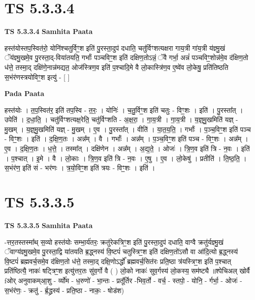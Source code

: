 \documentclass[17pt]{extarticle}
\begin{document}

\section{ TS 5.3.3.4 }

\textbf{TS 5.3.3.4 } \newline
\textbf{Samhita Paata} \newline

हस्त॑योस्तप॒स्वित॑रो॒ योनि॑श्चतुर्विꣳ॒॒श इति॑ पु॒रस्ता॒दुप॑ दधाति॒ चतु॑र्विꣳशत्यक्षरा गाय॒त्री गा॑य॒त्री य॑ज्ञ्मु॒खं ॅय॑ज्ञ्मु॒खमे॒व पु॒रस्ता॒द्-विया॑तयति॒ गर्भाः᳚ पञ्चविꣳ॒॒श इति॑ दक्षिण॒तोऽन्नं॒ ॅवै गर्भा॒ अन्नं॑ पञ्चविꣳ॒॒शोन्न॑मे॒व द॑क्षिण॒तो ध॑त्ते॒ तस्मा॒द् दक्षि॑णे॒नान्न॑मद्यत॒ ओज॑स्त्रिण॒व इति॑ प॒श्चादि॒मे वै लो॒कास्त्रि॑ण॒व ए॒ष्वे॑व लो॒केषु॒ प्रति॑तिष्ठति स॒भंर॑णस्त्रयोविꣳ॒॒श इत्यु॑ - [  ] \newline

\textbf{Pada Paata} \newline

हस्त॑योः । त॒प॒स्वित॑र॒ इति॑ तप॒स्वि - त॒रः॒ । योनिः॑ । च॒तु॒र्विꣳ॒॒श इति॑ चतुः - विꣳ॒॒शः । इति॑ । पु॒रस्ता᳚त् । उपेति॑ । द॒धा॒ति॒ । चतु॑र्विꣳशत्यक्ष॒रेति॒ चतु॑र्विꣳशति - अ॒क्ष॒रा॒ । गा॒य॒त्री । गा॒य॒त्री । य॒ज्ञ्॒मु॒खमिति॑ यज्ञ् - मु॒खम् । य॒ज्ञ्॒मु॒खमिति॑ यज्ञ् - मु॒खम् । ए॒व । पु॒रस्ता᳚त् । वीति॑ । या॒त॒य॒ति॒ । गर्भाः᳚ । प॒ञ्च॒विꣳ॒॒श इति॑ पञ्च - विꣳ॒॒शः । इति॑ । द॒क्षि॒ण॒तः । अन्न᳚म् । वै । गर्भाः᳚ । अन्न᳚म् । प॒ञ्च॒विꣳ॒॒श इति॑ पञ्च - विꣳ॒॒शः । अन्न᳚म् । ए॒व । द॒क्षि॒ण॒तः । ध॒त्ते॒ । तस्मा᳚त् । दक्षि॑णेन । अन्न᳚म् । अ॒द्य॒ते॒ । ओजः॑ । त्रि॒ण॒व इति॑ त्रि - न॒वः । इति॑ । प॒श्चात् । इ॒मे । वै । लो॒काः । त्रि॒ण॒व इति॑ त्रि - न॒वः । ए॒षु । ए॒व । लो॒केषु॑ । प्रतीति॑ । ति॒ष्ठ॒ति॒ । स॒भंर॑ण॒ इति॑ सं - भर॑णः । त्र॒यो॒विꣳ॒॒श इति॑ त्रयः - विꣳ॒॒शः । इति॑ ।  \newline





\section{ TS 5.3.3.5 }

\textbf{TS 5.3.3.5 } \newline
\textbf{Samhita Paata} \newline

-त्तर॒तस्तस्मा᳚थ् स॒व्यो हस्त॑योः सम्भा॒र्य॑तरः॒ क्रतु॑रेकत्रिꣳ॒॒श इति॑ पु॒रस्ता॒दुप॑ दधाति॒ वाग्वै क्रतु॑र्यज्ञ्मु॒खं ॅवाग्य॑ज्ञ्मु॒खमे॒व पु॒रस्ता॒द्वि या॑तयति ब्र॒द्ध्नस्य॑ वि॒ष्टपं॑ चतुस्त्रिꣳ॒॒श इति॑ दक्षिण॒तो॑ऽसौ वा आ॑दि॒त्यो ब्र॒द्ध्नस्य॑ वि॒ष्टपं॑ ब्रह्मवर्च॒समे॒व द॑क्षिण॒तो ध॑त्ते॒ तस्मा॒द् दक्षि॒णोऽर्द्धो᳚ ब्रह्मवर्च॒सित॑रः प्रति॒ष्ठा त्र॑यस्त्रिꣳ॒॒श इति॑ प॒श्चात् प्रति॑ष्ठित्यै॒ नाकः॑ षट्त्रिꣳ॒॒श इत्यु॑त्तर॒तः सु॑व॒र्गो वै ( ) लो॒को नाकः॑ सुव॒र्गस्य॑ लो॒कस्य॒ सम॑ष्ट्यै ॥श्पेचिअल् खोर्वै fओर् अनुवाकम्आ॒शु - र्व्यो॑म - ध॒रुणो॑ - भा॒न्तः - प्रतू᳚र्तिर -भिव॒र्तो - वर्च॒ - स्तपो॒ - योनि॒ - र्गर्भा॒ - ओजः॑ - स॒भंर॑णः॒ - क्रतु॑ - र्ब्र॒द्ध्रस्य॑ - प्रति॒ष्ठा - नाकः॒ - षोड॑श) \newline
\end{document}
